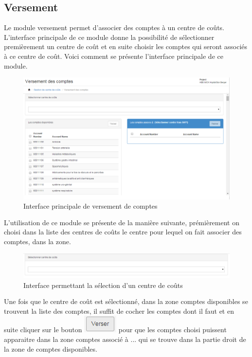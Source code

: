 \documentclass[12pt,a4paper]{report}
\begin{document}
\subsection{Versement}
Le module versement permet d'associer des comptes à un centre de coûts. L'interface principale de ce module donne la possibilité de sélectionner premièrement un centre de coût et en suite choisir les comptes qui seront associés à ce centre de coût. Voici comment se présente l'interface principale de ce module.

\begin{figure}[h]
\begin{center}
\includegraphics[width=12cm]{pic/VersmtCompte.png}
\end{center}
\caption{Interface principale de versement de comptes}
\label{Interface principale de versement de comptes}
\end{figure} 

L'utilisation de ce module se présente de la manière suivante, prémièrement on choisi dans la liste des centres de coûts le centre pour lequel on fait associer des comptes, dans la zone.

\begin{figure}[h]
\begin{center}
\includegraphics[width=12cm]{pic/SelectCostCenter.png}
\end{center}
\caption{Interface permettant la sélection d'un centre de coûts}
\label{Interface permettant la sélection d'un centre de coûts}
\end{figure} 

Une fois que le centre de coût est sélectionné, dans la zone comptes disponibles se trouvent la liste des comptes, il suffit de cocher les comptes dont il faut et en suite cliquer sur le bouton \includegraphics[scale=0.7]{pic/VerserCompte.png} pour que les comptes choisi puissent apparaitre dans la zone comptes associé à ... qui se trouve dans la partie droit de la zone de comptes disponibles.
\end{document}
